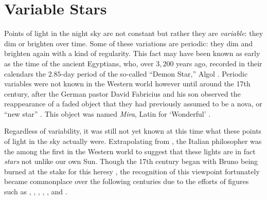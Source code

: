 \section{Variable Stars} 
\label{sec:history}

Points of light in the night sky are not constant but rather they are \emph{variable}: they dim or brighten over time. 
Some of these variations are periodic: they dim and brighten again with a kind of regularity. 
This fact may have been known as early as the time of the ancient Egyptians, who, over $3,200$ years ago, recorded in their calendars the $2.85$-day period of the so-called ``Demon Star,'' Algol \citep[e.g.,][]{jetsu2015shifting}. 
Periodic variables were not known in the Western world however until around the 17th century, after the German pastor David Fabricius and his son observed the reappearance of a faded object that they had previously assumed to be a nova, or ``new star'' \citep[e.g.,][]{2015pust.book.....C}. 
This object was named \emph{Mira}, Latin for `Wonderful' \citep{1662ihms.book.....H}. 

Regardless of variability, it was still not yet known at this time what these points of light in the sky actually were. 
Extrapolating from \citet{copernicus}, the Italian philosopher  %
was the among the first in the Western world to suggest that these lights are in fact \emph{stars} not unlike our own Sun. 
Though the 17th century began with Bruno being burned at the stake for this heresy \citep[e.g.,][]{bruno1998giordano}, the recognition of this viewpoint fortunately became commonplace over the following centuries due to the efforts of figures such as \citet{kepler}, , \citet{newton}, \citet{huygens}, \citet{1838AN.....16...65B}, and \citet{sacchi}. 

